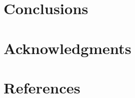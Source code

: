 \documentclass[onecolumn,3p]{elsarticle}
\begin{document}
\section{Conclusions}
\section*{Acknowledgments}
\section*{References}


%

%






% 
% 

\end{document}
